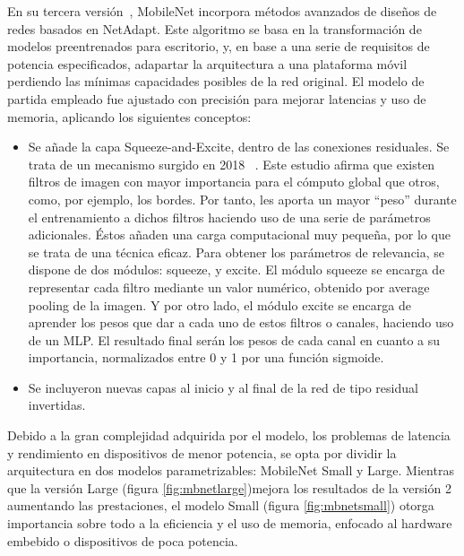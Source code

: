 En su tercera versión~\cite{howard2019searching}, MobileNet incorpora métodos avanzados de diseños de redes basados en NetAdapt. Este algoritmo se basa en la transformación de modelos preentrenados para escritorio, y, en base a una serie de requisitos de potencia especificados, adapartar la arquitectura a una plataforma móvil perdiendo las mínimas capacidades posibles de la red original.  El modelo de partida empleado fue ajustado con precisión para mejorar latencias y uso de memoria, aplicando los siguientes conceptos:

\begin{itemize}
    \item Se añade la capa Squeeze-and-Excite, dentro de las conexiones residuales. Se trata de un mecanismo surgido en 2018 ~\cite{hu2019squeezeandexcitation}. Este estudio afirma que existen filtros de imagen con mayor importancia para el cómputo global que otros, como, por ejemplo, los bordes. Por tanto, les aporta un mayor ``peso'' durante el entrenamiento a dichos filtros haciendo uso de una serie de parámetros adicionales. Éstos añaden una carga computacional muy pequeña, por lo que se trata de una técnica eficaz. Para obtener los parámetros de relevancia, se dispone de dos módulos: squeeze, y excite. El módulo squeeze se encarga de representar cada filtro mediante un valor numérico, obtenido por average pooling de la imagen. Y por otro lado, el módulo excite se encarga de aprender los pesos que dar a cada uno de estos filtros o canales, haciendo uso de un MLP. El resultado final serán los pesos de cada canal en cuanto a su importancia, normalizados entre 0 y 1 por una función sigmoide.

    \item Se incluyeron nuevas capas al inicio y al final de la red de tipo residual invertidas.
\end{itemize}


Debido a la gran complejidad adquirida por el modelo, los problemas de latencia y rendimiento en dispositivos de menor potencia, se opta por dividir la arquitectura en dos modelos parametrizables: MobileNet Small y Large. Mientras que la versión Large (figura \ref{fig:mbnetlarge})mejora los resultados de la versión 2 aumentando las prestaciones, el modelo Small (figura \ref{fig:mbnetsmall}) otorga importancia sobre todo a la eficiencia y el uso de memoria, enfocado al hardware embebido o dispositivos de poca potencia.

